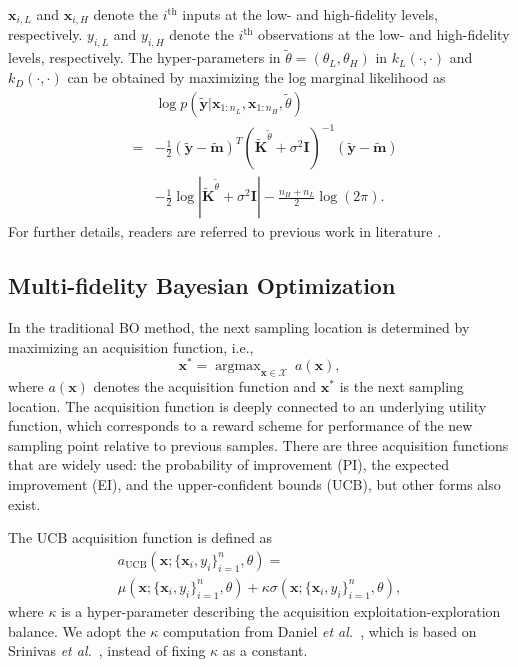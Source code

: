 \documentclass[%
 reprint,
aip,jcp
]{revtex4-1}
\DeclareMathOperator*{\argmax}{argmax}
\begin{document}
$\bm{x}_{i,L}$ and $\bm{x}_{i,H}$ denote the $i^{\text{th}}$ inputs at the low- and high-fidelity levels, respectively. 
$y_{i,L}$ and $y_{i,H}$ denote the $i^{\text{th}}$ observations at the low- and high-fidelity levels, respectively. 
The hyper-parameters in $\tilde{\theta} = (\theta_L, \theta_H)$ in $k_L(\cdot,\cdot)$ and $k_D(\cdot,\cdot)$ can be obtained by maximizing the log marginal likelihood as
\begin{equation}
\begin{array}{lll}
&& \log p(\tilde{\bm{y}} | \bm{x}_{1:n_L}, \bm{x}_{1:n_H}, \tilde{\theta}) \\
&=& - \frac{1}{2} (\tilde{\bm{y}} - \tilde{\bm{m}})^T (\tilde{\bm{K}}^{\tilde{\theta}} + \sigma^2 \bm{I})^{-1} (\tilde{\bm{y}} - \tilde{\bm{m}}) \\
&& - \frac{1}{2} \log{| \tilde{\bm{K}}^{\tilde{\theta}} + \sigma^2 \bm{I} |} - \frac{n_H + n_L}{2} \log{(2\pi)}.
\end{array}
\end{equation}
For further details, readers are referred to previous work in literature \cite{couckuyt2013oodace,xiao2018extended,yang2020bifidelity}.


\subsection{Multi-fidelity Bayesian Optimization}
\label{subsec:AcqFunc}
In the traditional BO method, the next sampling location is determined by maximizing an acquisition function, i.e.,
\begin{equation}
\bm{x}^* = \argmax_{\bm{x} \in \mathcal{X}} \ a(\bm{x}), 
\end{equation}
where $a(\bm{x})$ denotes the acquisition function and $\bm{x}^*$ is the next sampling location. 
The acquisition function is deeply connected to an underlying utility function, which corresponds to a reward scheme for performance of the new sampling point relative to previous samples. 
There are three acquisition functions that are widely used: the probability of improvement (PI), the expected improvement (EI), and the upper-confident bounds (UCB), but other forms also exist. 

The UCB acquisition function \cite{srinivas2009gaussian,srinivas2012information,daniel2014active} is defined as
\begin{multline}
a_{\text{UCB}}(\bm{x};\{\bm{x}_i,y_i \}_{i=1}^n,\theta) = \\
\mu(\bm{x};\{\bm{x}_i,y_i \}_{i=1}^n,\theta) + \kappa \sigma(\bm{x};\{\bm{x}_i,y_i \}_{i=1}^n,\theta),
\end{multline}
where $\kappa$ is a hyper-parameter describing the acquisition exploitation-exploration balance. 
We adopt the $\kappa$ computation from Daniel \emph{et al.}~\cite{daniel2014active}, which is based on Srinivas \emph{et al.}~\cite{srinivas2009gaussian,srinivas2012information}, instead of fixing $\kappa$ as a constant. 
\end{document}
